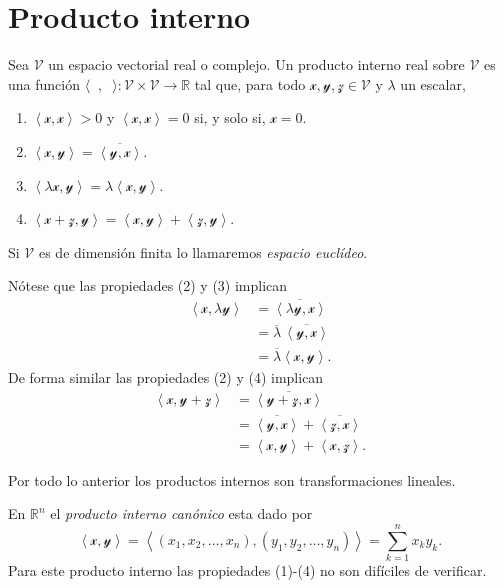 \documentclass[twocolumn]{notasdeclase}
\newcommand{\ve}[1]{\mathscr{#1}}
\newcommand{\V}{\mathcal{V}}
\newcommand{\iprod}{\langle\phantom{x},\phantom{x}\rangle}
\newcommand{\Iprod}[2]{\left\langle#1,#2\right\rangle}
\renewcommand{\t}{\times}
\newcommand{\dt}[2]{#1_1 #2 #1_2 #2 \dots #2 #1_n}
\newcommand{\Rn}{\mathbb{R}^n}
\newcommand{\R}{\mathbb{R}}
\begin{document}
\section{Producto interno}
\begin{defi}
	Sea $\V$ un espacio vectorial real o complejo. Un producto interno real sobre $\V$ es una función $\iprod\colon\V\t\V\to\R$ tal que, para todo $\ve{x,y,z}\in\V$ y $\lambda$ un escalar,
	\begin{enumerate}
		\item $\Iprod{\ve x}{\ve x}>0$ y $\Iprod{\ve x}{\ve x} = 0$ si, y solo si, $\ve x=0$.
		\item $\Iprod{\ve x}{\ve y} = \overline{\Iprod{\ve y}{\ve x}}$.
		\item $\Iprod{\lambda\ve x}{\ve y} = \lambda\Iprod{\ve x}{\ve y}$.
		\item $\Iprod{\ve x+\ve z}{\ve y} = \Iprod{\ve x}{\ve y} + \Iprod{\ve z}{\ve y}$.
	\end{enumerate}
Si $\V$ es de dimensión finita lo llamaremos \emph{espacio euclídeo}.
\end{defi}

Nótese que las propiedades (2) y (3) implican
\begin{align*}
	\Iprod{\ve x}{\lambda \ve y} &= \overline{\Iprod{\lambda\ve y}{\ve x}} \\
						 		 &= \overline{\lambda}\,\overline{\Iprod{\ve y}{\ve x}} \\
						 		 &= \overline{\lambda}\Iprod{\ve x}{\ve y}.
\end{align*}
De forma similar las propiedades (2) y (4) implican
\begin{align*}
	\Iprod{\ve x}{\ve y+\ve z} &= \overline{\Iprod{\ve y+\ve z}{\ve x}} \\
							&= \overline{\Iprod{\ve y}{\ve x}} + \overline{\Iprod{\ve z}{\ve x}} \\
							&= \Iprod{\ve x}{\ve y} + \Iprod{\ve x}{\ve z}.
\end{align*}

Por todo lo anterior los productos internos son transformaciones lineales.

\begin{ejem}
	En $\Rn$ el \emph{producto interno canónico} esta dado por
	\[ \Iprod{\ve x}{\ve y} = \Iprod{(\dt{x}{,})}{(\dt{y}{,})} = \sum_{k=1}^{n} x_ky_k.\]
	Para este producto interno las propiedades (1)-(4) no son difíciles de verificar.
\end{ejem}
\end{document}
